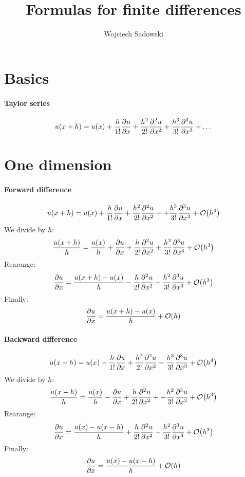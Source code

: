 \documentclass{article}
\title{Formulas for finite differences}
\author{Wojciech Sadowski}
\begin{document}
\maketitle
\section{Basics}
\paragraph{Taylor series}
\[
  u(x + h) = u(x) 
  + \frac{h}{1!}\pdv{u}{x} 
  + \frac{h^2}{2!}\pdv[2]{u}{x} 
  + \frac{h^3}{3!}\pdv[3]{u}{x} + \dots
\]

\section{One dimension}
\paragraph{Forward difference}
\[
  u(x + h) = u(x) 
  + \frac{h}{1!}\pdv{u}{x} 
  + \frac{h^2}{2!}\pdv[2]{u}{x} +
  + \frac{h^3}{3!}\pdv[3]{u}{x} +
  \mathcal{O}\qty(h^4)
\]
We divide by \(h\):
\[
  \frac{u(x + h)}{h} = \frac{u(x)}{h} 
  + \pdv{u}{x} 
  + \frac{h}{2!}\pdv[2]{u}{x} 
  + \frac{h^2}{3!}\pdv[3]{u}{x} 
  + \mathcal{O}\qty(h^3)
\]
Rearange:
\begin{equation}\label{eq::forward}
   \pdv{u}{x} 
   = \frac{u(x + h) - u(x)}{h}  
  - \frac{h}{2!}\pdv[2]{u}{x} 
  - \frac{h^2}{3!}\pdv[3]{u}{x} 
  + \mathcal{O}\qty(h^3)
\end{equation}
Finally:
\[
   \pdv{u}{x} 
   = \frac{u(x + h) - u(x)}{h}  + \mathcal{O}\qty(h)
\]

\paragraph{Backward difference}
\[
  u(x - h) = u(x) 
  - \frac{h}{1!}\pdv{u}{x} 
  + \frac{h^2}{2!}\pdv[2]{u}{x} 
  - \frac{h^3}{3!}\pdv[3]{u}{x} 
  + \mathcal{O}\qty(h^4)
\]
We divide by \(h\):
\[
  \frac{u(x - h)}{h} = \frac{u(x)}{h} 
  -\pdv{u}{x} 
  + \frac{h}{2!}\pdv[2]{u}{x} +
  - \frac{h^2}{3!}\pdv[3]{u}{x} +
  \mathcal{O}\qty(h^3)
\]
Rearange:
\begin{equation}\label{eq::backward}
   \pdv{u}{x} 
   = \frac{u(x) - u(x-h)}{h}  
  + \frac{h}{2!}\pdv[2]{u}{x} 
  - \frac{h^2}{3!}\pdv[3]{u}{x} 
  + \mathcal{O}\qty(h^3)
\end{equation}
Finally:
\[
   \pdv{u}{x} 
   = \frac{u(x) - u(x - h)}{h}  + \mathcal{O}\qty(h)
\]
\end{document}
